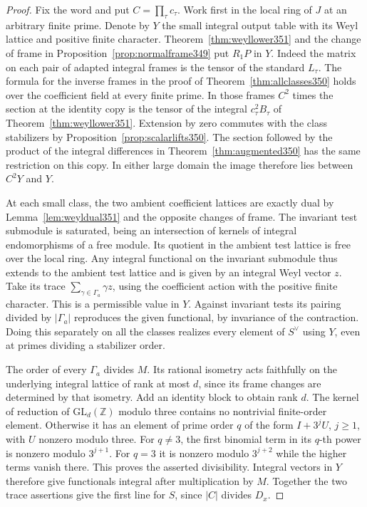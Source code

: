 \documentclass[a4paper,11pt]{article}
\theoremstyle{definition}
\theoremstyle{remark}
\numberwithin{equation}{section}
\begin{document}
\begin{proof}
Fix the word and put \(C=\prod_\tau c_\tau\).
Work first in the local ring of \(J\) at an arbitrary finite
prime. Denote by \(Y\) the small integral output table with
its Weyl lattice and positive finite character. Theorem~\ref{thm:weyllower351}
and the change of frame in Proposition~\ref{prop:normalframe349}
put \(R_1P\) in \(Y\). Indeed the matrix on each pair of
adapted integral frames is the tensor of the standard \(L_\tau\).
The formula for the inverse frames in the proof of
Theorem~\ref{thm:allclasses350} holds over the coefficient field
at every finite prime. In those frames \(C^2\) times the
section at the identity copy is the tensor of the integral
\(c_\tau^2 B_\tau\) of Theorem~\ref{thm:weyllower351}.
Extension by zero commutes with the class stabilizers by
Proposition~\ref{prop:scalarlifts350}. The section followed by
the product of the integral differences in
Theorem~\ref{thm:augmented350} has the same restriction on this
copy. In either large domain the image therefore lies between
\(C^2Y\) and \(Y\).

At each small class, the two ambient coefficient lattices are
exactly dual by Lemma~\ref{lem:weyldual351} and the opposite
changes of frame. The invariant test submodule is saturated,
being an intersection of kernels of integral endomorphisms of a
free module. Its quotient in the ambient test lattice is free
over the local ring. Any integral functional on the invariant
submodule thus extends to the ambient test lattice and is given
by an integral Weyl vector \(z\). Take its trace
\(\sum_{\gamma\in\Gamma_a}\gamma z\), using the coefficient
action with the positive finite character. This is a permissible
value in \(Y\). Against invariant tests its pairing divided by
\(|\Gamma_a|\) reproduces the given functional, by invariance of
the contraction. Doing this separately on all the classes realizes
every element of \(S^\vee\) using \(Y\), even at primes dividing
a stabilizer order.

The order of every \(\Gamma_a\) divides \(M\). Its rational
isometry acts faithfully on the underlying integral lattice of
rank at most \(d\), since its frame changes are determined by
that isometry. Add an identity block to obtain rank \(d\). The
kernel of reduction of \(\mathrm{GL}_d(\mathbb Z)\) modulo three
contains no nontrivial finite-order element. Otherwise it has
an element of prime order \(q\) of the form \(I+3^jU\),
\(j\ge1\), with \(U\) nonzero modulo three. For \(q\ne3\),
the first binomial term in its \(q\)-th power is nonzero modulo
\(3^{j+1}\). For \(q=3\) it is nonzero modulo \(3^{j+2}\)
while the higher terms vanish there. This proves the asserted
divisibility. Integral vectors in \(Y\) therefore give
functionals integral after multiplication by \(M\).
Together the two trace assertions give the first line for \(S\),
since \(|C|\) divides \(D_x\).


\end{proof}
\end{document}
